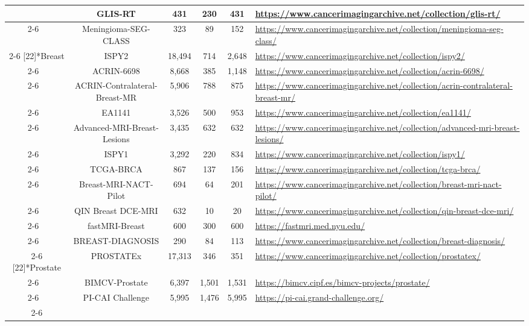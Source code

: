 \begin{table}[!h]
{\begin{tabular}{ccccc m{9cm}}
		~ & GLIS-RT & 431 & 230 & 431 & \url{https://www.cancerimagingarchive.net/collection/glis-rt/} \\  \cline{2-6}
		~ & Meningioma-SEG-CLASS & 323 & 89 & 152 & \url{https://www.cancerimagingarchive.net/collection/meningioma-seg-class/} \\ \cline{2-6}
		 \hline
		\multirow{11}[22]{*}{Breast} & ISPY2 & 18,494 & 714 & 2,648 & \url{https://www.cancerimagingarchive.net/collection/ispy2/} \\ \cline{2-6}
		~ & ACRIN-6698 & 8,668 & 385 & 1,148 & \url{https://www.cancerimagingarchive.net/collection/acrin-6698/} \\ \cline{2-6}
		~ & ACRIN-Contralateral-Breast-MR & 5,906 & 788 & 875 & \url{https://www.cancerimagingarchive.net/collection/acrin-contralateral-breast-mr/} \\ \cline{2-6}
		~ & EA1141 & 3,526 & 500 & 953 & \url{https://www.cancerimagingarchive.net/collection/ea1141/} \\\cline{2-6}
		~ & Advanced-MRI-Breast-Lesions & 3,435 & 632 & 632 & \url{https://www.cancerimagingarchive.net/collection/advanced-mri-breast-lesions/} \\ \cline{2-6}
		~ & ISPY1 & 3,292 & 220 & 834 & \url{https://www.cancerimagingarchive.net/collection/ispy1/} \\ \cline{2-6}
		~ & TCGA-BRCA & 867 & 137 & 156 & \url{https://www.cancerimagingarchive.net/collection/tcga-brca/} \\ \cline{2-6}
		~ & Breast-MRI-NACT-Pilot & 694 & 64 & 201 & \url{https://www.cancerimagingarchive.net/collection/breast-mri-nact-pilot/} \\ \cline{2-6}
		~ & QIN Breast DCE-MRI & 632 & 10 & 20 & \url{https://www.cancerimagingarchive.net/collection/qin-breast-dce-mri/} \\ \cline{2-6}
		~ & fastMRI-Breast & 600 & 300 & 600 & \url{https://fastmri.med.nyu.edu/} \\\cline{2-6}
		~ & BREAST-DIAGNOSIS & 290 & 84 & 113 & \url{https://www.cancerimagingarchive.net/collection/breast-diagnosis/} \\ \cline{2-6}
		 \hline
		\multirow{11}[22]{*}{Prostate} & PROSTATEx & 17,313 & 346 & 351 & \url{https://www.cancerimagingarchive.net/collection/prostatex/} \\ \cline{2-6}
		~ & BIMCV-Prostate & 6,397 & 1,501 & 1,531 & \url{https://bimcv.cipf.es/bimcv-projects/prostate/} \\\cline{2-6}
		~ & PI-CAI Challenge & 5,995 & 1,476 & 5,995 & \url{https://pi-cai.grand-challenge.org/} \\ \cline{2-6}

\end{tabular}}
\end{table}
